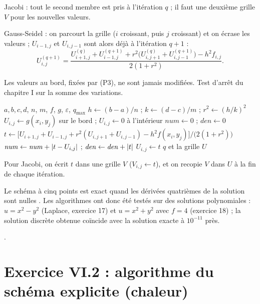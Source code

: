  Jacobi : tout le second membre est pris à l'itération $q$ ; il faut
une deuxième grille $V$ pour les nouvelles valeurs.

 Gauss-Seidel : on parcourt la grille ($i$ croissant, puis $j$
croissant) et on écrase les valeurs ; $U_{i-1,j}$ et $U_{i,j-1}$ sont alors
déjà à l'itération $q+1$ :
\[
  U^{(q+1)}_{i,j} = \frac{U^{(q)}_{i+1,j} + U^{(q+1)}_{i-1,j}
     + r^2\bigl(U^{(q)}_{i,j+1} + U^{(q+1)}_{i,j-1}\bigr) - h^2f_{i,j}}{2(1 + r^2)} .
\]

 Les valeurs au bord, fixées par (P3), ne sont jamais modifiées. Test
d'arrêt du chapitre I sur la somme des variations.

\begin{algo}
  \Require $a, b, c, d$, $n$, $m$, $f$, $g$, $\varepsilon$, $q_{\max}$
  \State $h \leftarrow (b-a)/n$ ; $k \leftarrow (d-c)/m$ ; $r^2 \leftarrow (h/k)^2$
  \State $U_{i,j} \leftarrow g(x_i, y_j)$ sur le bord ; $U_{i,j} \leftarrow 0$ à l'intérieur
    \State $\mathit{num} \leftarrow 0$ ; $\mathit{den} \leftarrow 0$
        \State $t \leftarrow \bigl[U_{i+1,j} + U_{i-1,j} + r^2(U_{i,j+1} + U_{i,j-1}) - h^2f(x_i,y_j)\bigr]/\bigl(2(1+r^2)\bigr)$
        \State $\mathit{num} \leftarrow \mathit{num} + \left|t - U_{i,j}\right|$ ; $\mathit{den} \leftarrow \mathit{den} + \left|t\right|$
        \State $U_{i,j} \leftarrow t$
      \EndFor
    \EndFor
     \Print $q$ et la grille $U$ \Stop \EndIf
  \EndFor
\end{algo}
Pour Jacobi, on écrit $t$ dans une grille $V$ ($V_{i,j} \leftarrow t$), et on
recopie $V$ dans $U$ à la fin de chaque itération.

\Verif Le schéma à cinq points est exact quand les dérivées quatrièmes de la
solution sont nulles . Les algorithmes ont donc été testés sur des
solutions polynomiales : $u = x^2 - y^2$ (Laplace, exercice 17) et
$u = x^2 + y^2$ avec $f = 4$ (exercice 18) ; la solution discrète obtenue
coïncide avec la solution exacte à $10^{-11}$ près.

\Refs {}.

\section{Exercice VI.2 : algorithme du schéma explicite (chaleur)}


